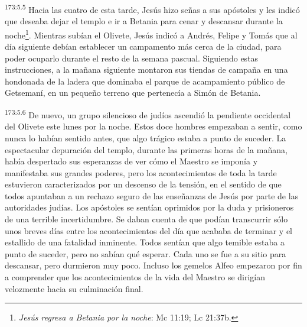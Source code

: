 \par 
\textsuperscript{173:5.5} Hacia las cuatro de esta tarde, Jesús hizo señas a sus apóstoles y les indicó que deseaba dejar el templo e ir a Betania para cenar y descansar durante la noche\footnote{\textit{Jesús regresa a Betania por la noche}: Mc 11:19; Lc 21:37b.}. Mientras subían el Olivete, Jesús indicó a Andrés, Felipe y Tomás que al día siguiente debían establecer un campamento más cerca de la ciudad, para poder ocuparlo durante el resto de la semana pascual. Siguiendo estas instrucciones, a la mañana siguiente montaron sus tiendas de campaña en una hondonada de la ladera que dominaba el parque de acampamiento público de Getsemaní, en un pequeño terreno que pertenecía a Simón de Betania.

\par 
\textsuperscript{173:5.6} De nuevo, un grupo silencioso de judíos ascendió la pendiente occidental del Olivete este lunes por la noche. Estos doce hombres empezaban a sentir, como nunca lo habían sentido antes, que algo trágico estaba a punto de suceder. La espectacular depuración del templo, durante las primeras horas de la mañana, había despertado sus esperanzas de ver cómo el Maestro se imponía y manifestaba sus grandes poderes, pero los acontecimientos de toda la tarde estuvieron caracterizados por un descenso de la tensión, en el sentido de que todos apuntaban a un rechazo seguro de las enseñanzas de Jesús por parte de las autoridades judías. Los apóstoles se sentían oprimidos por la duda y prisioneros de una terrible incertidumbre. Se daban cuenta de que podían transcurrir sólo unos breves días entre los acontecimientos del día que acababa de terminar y el estallido de una fatalidad inminente. Todos sentían que algo temible estaba a punto de suceder, pero no sabían qué esperar. Cada uno se fue a su sitio para descansar, pero durmieron muy poco. Incluso los gemelos Alfeo empezaron por fin a comprender que los acontecimientos de la vida del Maestro se dirigían velozmente hacia su culminación final.